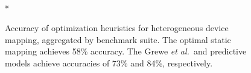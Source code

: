 \begin{figure}
	\centering %
	\\* %
	\caption{%
		Accuracy of optimization heuristics for heterogeneous device mapping, aggregated by benchmark suite. The optimal static mapping achieves 58\% accuracy. The Grewe \emph{et al.\ }and \DeepTune predictive models achieve accuracies of 73\% and 84\%, respectively. %
    }
	\label{fig:cgo-accuracy}
\end{figure}

